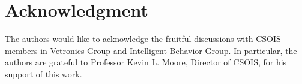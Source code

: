\documentclass{cdcarta4}
\begin{document}
\section*{Acknowledgment}
The authors would like to acknowledge the fruitful discussions with 
CSOIS members in Vetronics Group and Intelligent Behavior Group. In particular, 
  the authors are grateful to Professor Kevin L. Moore,  Director of CSOIS, for his   support  of this work.
 

 
\end{document}
